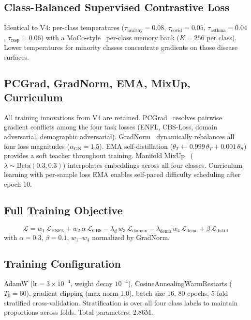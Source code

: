 \documentclass[journal]{IEEEtran}
\newcommand{\Lc}{\mathcal{L}}
\begin{document}
\subsection{Class-Balanced Supervised Contrastive Loss}

Identical to V4: per-class temperatures
($\tau_\text{healthy}{=}0.08$, $\tau_\text{covid}{=}0.05$,
$\tau_\text{asthma}{=}0.04$, $\tau_\text{resp}{=}0.06$)
with a MoCo-style~\cite{moco} per-class memory bank ($K{=}256$
per class). Lower temperatures for minority classes concentrate
gradients on those disease surfaces.

\subsection{PCGrad, GradNorm, EMA, MixUp, Curriculum}

All training innovations from V4 are retained. PCGrad~\cite{pcgrad}
resolves pairwise gradient conflicts among the four task losses
(ENFL, CBS-Loss, domain adversarial, demographic adversarial).
GradNorm~\cite{gradnorm} dynamically rebalances all four loss magnitudes
($\alpha_\text{GN}{=}1.5$). EMA self-distillation ($\theta_T \leftarrow
0.999\,\theta_T + 0.001\,\theta_S$) provides a soft teacher throughout
training. Manifold MixUp~\cite{manifoldmixup}
($\lambda\sim\mathrm{Beta}(0.3,0.3)$) interpolates embeddings across
all four classes. Curriculum learning with per-sample loss EMA enables
self-paced difficulty scheduling after epoch 10.

\subsection{Full Training Objective}

\begin{equation}
\Lc = w_1\,\Lc_\text{ENFL}
    + w_2\,\alpha\,\Lc_\text{CBS}
    - \lambda_d\,w_3\,\Lc_\text{domain}
    - \lambda_\text{demo}\,w_4\,\Lc_\text{demo}
    + \beta\,\Lc_\text{distill}
\label{eq:total}
\end{equation}
with $\alpha{=}0.3$, $\beta{=}0.1$, $w_1\text{--}w_4$ normalized by GradNorm.

\subsection{Training Configuration}

AdamW ($\mathrm{lr}{=}3\times10^{-4}$, weight decay $10^{-4}$),
CosineAnnealingWarmRestarts ($T_0{=}60$), gradient clipping
(max norm 1.0), batch size 16, 80 epochs, 5-fold stratified
cross-validation. Stratification is over all four class labels
to maintain proportions across folds. Total parameters: 2.86M.
\end{document}
